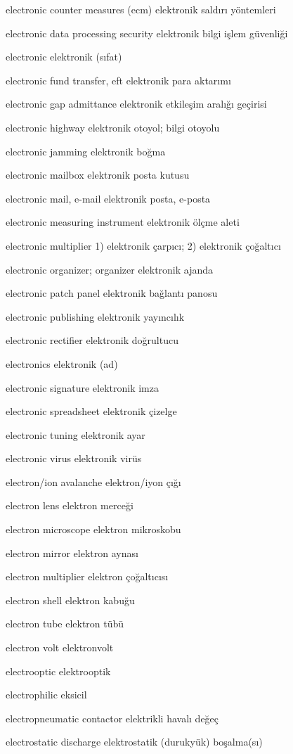 \documentclass[12pt,fleqn]{article}\usepackage{../../common}
\begin{document}
electronic counter measures (ecm) elektronik saldırı yöntemleri

electronic data processing security elektronik bilgi işlem güvenliği

electronic elektronik (sıfat)

electronic fund transfer, eft elektronik para aktarımı

electronic gap admittance elektronik etkileşim aralığı geçirisi

electronic highway elektronik otoyol; bilgi otoyolu

electronic jamming elektronik boğma

electronic mailbox elektronik posta kutusu

electronic mail, e-mail elektronik posta, e-posta

electronic measuring instrument elektronik ölçme aleti

electronic multiplier 1) elektronik çarpıcı; 2) elektronik çoğaltıcı

electronic organizer; organizer elektronik ajanda

electronic patch panel elektronik bağlantı panosu

electronic publishing elektronik yayıncılık

electronic rectifier elektronik doğrultucu

electronics elektronik (ad)

electronic signature elektronik imza

electronic spreadsheet elektronik çizelge

electronic tuning elektronik ayar

electronic virus elektronik virüs

electron/ion avalanche elektron/iyon çığı

electron lens elektron merceği

electron microscope elektron mikroskobu

electron mirror elektron aynası

electron multiplier elektron çoğaltıcısı

electron shell elektron kabuğu

electron tube elektron tübü

electron volt elektronvolt

electrooptic elektrooptik

electrophilic eksicil

electropneumatic contactor elektrikli havalı değeç

electrostatic discharge elektrostatik (durukyük) boşalma(sı)
\end{document}
